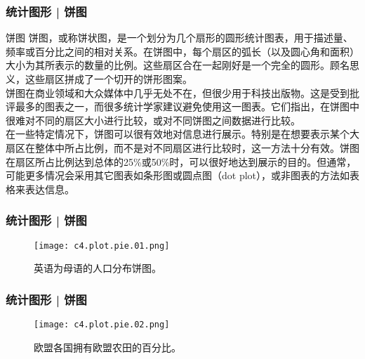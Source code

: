 \begin{frame}
  \frametitle{统计图形 | 饼图}
  \begin{block}{饼图}
饼图，或称饼状图，是一个划分为几个扇形的圆形统计图表，用于描述量、频率或百分比之间的相对关系。在饼图中，每个扇区的弧长（以及圆心角和面积）大小为其所表示的数量的比例。这些扇区合在一起刚好是一个完全的圆形。顾名思义，这些扇区拼成了一个切开的饼形图案。\\
\vspace{1em}
饼图在商业领域和大众媒体中几乎无处不在，但很少用于科技出版物。这是受到批评最多的图表之一，而很多统计学家建议避免使用这一图表。它们指出，在饼图中很难对不同的扇区大小进行比较，或对不同饼图之间数据进行比较。\\
\vspace{0.5em}
在一些特定情况下，饼图可以很有效地对信息进行展示。特别是在想要表示某个大扇区在整体中所占比例，而不是对不同扇区进行比较时，这一方法十分有效。饼图在扇区所占比例达到总体的25\%或50\%时，可以很好地达到展示的目的。但通常，可能更多情况会采用其它图表如条形图或圆点图（dot plot），或非图表的方法如表格来表达信息。
  \end{block}
\end{frame}

\begin{frame}
  \frametitle{统计图形 | 饼图}
  \begin{figure}
    \centering
    \texttt{[image: c4.plot.pie.01.png]}
    \caption{英语为母语的人口分布饼图。}
  \end{figure}
\end{frame}

\begin{frame}
  \frametitle{统计图形 | 饼图}
  \begin{figure}
    \centering
    \texttt{[image: c4.plot.pie.02.png]}
    \caption{欧盟各国拥有欧盟农田的百分比。}
  \end{figure}
\end{frame}

